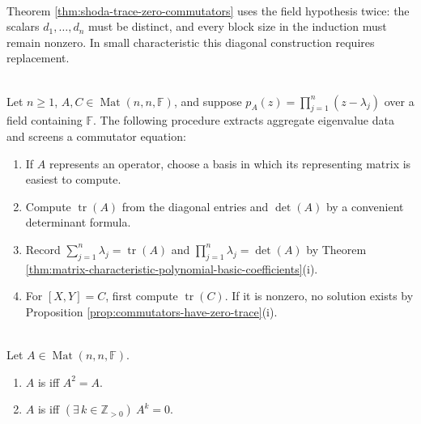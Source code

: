\begin{remark} \label{rem:shoda-field-hypothesis} \\
Theorem \ref{thm:shoda-trace-zero-commutators} uses the field hypothesis twice: the scalars $d_1,\ldots,d_n$ must be distinct, and every block size in the induction must remain nonzero. In small characteristic this diagonal construction requires replacement.
\end{remark}

\begin{computationmethod} \label{meth:trace-determinant-invariant-computation} \\
Let $n\geq1$, $A,C\in\operatorname{Mat}(n,n,\mathbb{F})$, and suppose $p_A(z)=\prod\limits_{j=1}^{n}(z-\lambda_j)$ over a field containing $\mathbb{F}$. The following procedure extracts aggregate eigenvalue data and screens a commutator equation:
\begin{enumerate}[label=(\roman*)]
\setlength{\itemsep}{0pt}
\item If $A$ represents an operator, choose a basis in which its representing matrix is easiest to compute.
\item Compute $\operatorname{tr}(A)$ from the diagonal entries and $\det(A)$ by a convenient determinant formula.
\item Record $\sum\limits_{j=1}^{n}\lambda_j=\operatorname{tr}(A)$ and $\prod\limits_{j=1}^{n}\lambda_j=\det(A)$ by Theorem \ref{thm:matrix-characteristic-polynomial-basic-coefficients}(i).
\item For $[X,Y]=C$, first compute $\operatorname{tr}(C)$. If it is nonzero, no solution exists by Proposition \ref{prop:commutators-have-zero-trace}(i).
\end{enumerate}
\end{computationmethod}

\begin{definition} \label{def:idempotent-and-nilpotent-matrices} \\
Let $A\in\operatorname{Mat}(n,n,\mathbb{F})$.
\begin{enumerate}[label=(\roman*)]
\setlength{\itemsep}{0pt}
\item $A$ is  iff $A^2=A$.
\item $A$ is  iff $(\exists\,k\in\mathbb{Z}_{>0})\ A^k=0$.
\end{enumerate}
\end{definition}


